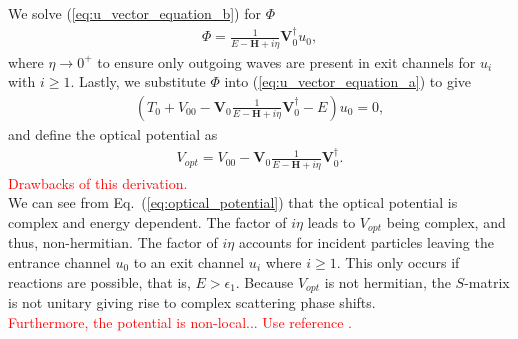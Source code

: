 \documentclass[preprintnumbers,floatfix,aps,prc,preprint,nofootinbib]{revtex4-1}
\begin{document}
%
We solve (\ref{eq:u_vector_equation_b}) for $\Phi$
%
\begin{eqnarray}
	\label{eq:phi}
	\Phi = \frac{1}{E - \textbf{H} + i \eta} \textbf{V}_0^{\dagger} u_0,
\end{eqnarray}
%
where $\eta \rightarrow 0^+$ to ensure only outgoing waves are present in exit channels for $u_i$ with $i \geq 1$. Lastly, we substitute $\Phi$ into (\ref{eq:u_vector_equation_a}) to give
%
\begin{eqnarray}
	\label{eq:u0_equation}
	(T_0 + V_{00}  - \textbf{V}_0 \frac{1}{E-\textbf{H}+i\eta} \textbf{V}_0^{\dagger} - E) u_0 = 0,
\end{eqnarray}
%
and define the optical potential as
%
\begin{eqnarray}
	\label{eq:optical_potential}
	V_{opt} = V_{00}  - \textbf{V}_0 \frac{1}{E-\textbf{H}+i\eta} \textbf{V}_0^{\dagger}.
\end{eqnarray}
%
\textcolor{red}{Drawbacks of this derivation.}
\\

We can see from Eq.~(\ref{eq:optical_potential}) that the optical potential is complex and energy dependent. The factor of $i \eta$ leads to $V_{opt}$ being complex, and thus, non-hermitian. The factor of $i \eta$ accounts for incident particles leaving the entrance channel $u_0$ to an exit channel $u_i$ where $i \geq 1$. This only occurs if reactions are possible, that is, $E > \epsilon_1$. Because $V_{opt}$ is not hermitian, the $S$-matrix is not unitary giving rise to complex scattering phase shifts.
\\

\textcolor{red}{Furthermore, the potential is non-local... Use reference \cite{Hodgson:1971ab}.}
\\
\end{document}

